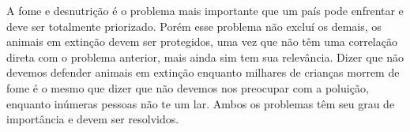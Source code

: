 \documentclass[a4paper, 12pt]{article}
\begin{document}
    \par A fome e desnutrição é o problema mais importante que um país pode enfrentar e deve ser totalmente priorizado. Porém esse problema não excluí os demais, os animais em extinção devem ser protegidos, uma vez que não têm uma correlação direta com o problema anterior, mais ainda sim tem sua relevância. Dizer que não devemos defender animais em extinção enquanto milhares de crianças morrem de fome é o mesmo que dizer que não devemos nos preocupar com a poluição, enquanto inúmeras pessoas não te um lar. Ambos os problemas têm seu grau de importância e devem ser resolvidos.
\end{document}
